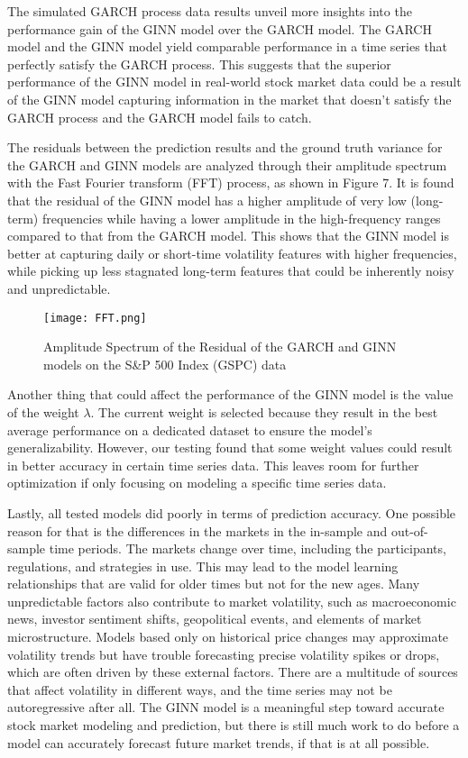 The simulated GARCH process data results unveil more insights into the performance gain of the GINN model over the GARCH model. The GARCH model and the GINN model yield comparable performance in a time series that perfectly satisfy the GARCH process. This suggests that the superior performance of the GINN model in real-world stock market data could be a result of the GINN model capturing information in the market that doesn't satisfy the GARCH process and the GARCH model fails to catch. 

The residuals between the prediction results and the ground truth variance for the GARCH and GINN models are analyzed through their amplitude spectrum with the Fast Fourier transform (FFT) process, as shown in Figure 7. It is found that the residual of the GINN model has a higher amplitude of very low (long-term) frequencies while having a lower amplitude in the high-frequency ranges compared to that from the GARCH model. This shows that the GINN model is better at capturing daily or short-time volatility features with higher frequencies, while picking up less stagnated long-term features that could be inherently noisy and unpredictable. 

\begin{figure}[h]
  \centering
  \texttt{[image: FFT.png]}
  \caption{Amplitude Spectrum of the Residual of the GARCH and GINN models on the S\&P 500 Index (GSPC) data}
\end{figure}

Another thing that could affect the performance of the GINN model is the value of the weight $\lambda$. The current weight is selected because they result in the best average performance on a dedicated dataset to ensure the model’s generalizability. However, our testing found that some weight values could result in better accuracy in certain time series data. This leaves room for further optimization if only focusing on modeling a specific time series data. 

Lastly, all tested models did poorly in terms of prediction accuracy. One possible reason for that is the differences in the markets in the in-sample and out-of-sample time periods. The markets change over time, including the participants, regulations, and strategies in use. This may lead to the model learning relationships that are valid for older times but not for the new ages. Many unpredictable factors also contribute to market volatility, such as macroeconomic news, investor sentiment shifts, geopolitical events, and elements of market microstructure. Models based only on historical price changes may approximate volatility trends but have trouble forecasting precise volatility spikes or drops, which are often driven by these external factors. There are a multitude of sources that affect volatility in different ways, and the time series may not be autoregressive after all. The GINN model is a meaningful step toward accurate stock market modeling and prediction, but there is still much work to do before a model can accurately forecast future market trends, if that is at all possible. 

